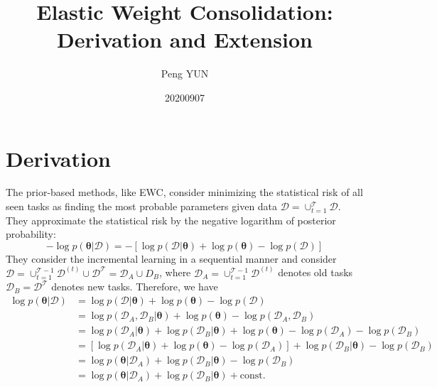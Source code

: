 \documentclass{article}
\title{Elastic Weight Consolidation: Derivation and Extension}
\author{Peng YUN}
\date{20200907}
\begin{document}
\maketitle


\section{Derivation}

The prior-based methods, like EWC\cite{Kirkpatrick2017}, consider minimizing the statistical risk
of all seen tasks as finding the most probable parameters given data
$\mathcal D = \cup_{t=1}^{\mathcal T} \mathcal D$.
They approximate the statistical risk by the negative logarithm of posterior probability:
\begin{equation}
    -\log p(\boldsymbol{\theta} | \mathcal D) = 
    -[\log p(\mathcal D | \boldsymbol{\theta}) + \log p(\boldsymbol{\theta}) - \log p(\mathcal D)]
\end{equation}
They consider the incremental learning in a sequential manner
and consider $\mathcal D = \cup_{t=1}^{\mathcal T-1} \mathcal D^{(t)} \cup \mathcal D^{\mathcal T}
= \mathcal D_A \cup D_B$,
where $\mathcal D_A = \cup_{t=1}^{\mathcal T-1} \mathcal D^{(t)}$ denotes old tasks
$\mathcal D_B =  \mathcal D^{\mathcal T}$ denotes new tasks.
Therefore, we have
\begin{equation}
\begin{split}
    \log p(\boldsymbol{\theta}|\mathcal D) &= \log p(\mathcal D | \boldsymbol{\theta}) + 
    \log p(\boldsymbol{\theta}) - \log p(\mathcal D)\\
    &= \log p(\mathcal D_A, \mathcal D_B | \boldsymbol{\theta}) + 
    \log p(\boldsymbol{\theta}) - \log p(\mathcal D_A, \mathcal D_B)\\
    &= \log p(\mathcal D_A| \boldsymbol{\theta}) + 
    \log p(\mathcal D_B | \boldsymbol{\theta}) + 
    \log p(\boldsymbol{\theta})
    - \log p(\mathcal D_A) - \log p(\mathcal D_B) \\
    &= [\log p(\mathcal D_A| \boldsymbol{\theta})
    +\log p(\boldsymbol{\theta})-\log p(\mathcal D_A)] 
    + \log p(\mathcal D_B | \boldsymbol{\theta}) - \log p(\mathcal D_B)\\
    &= \log p(\boldsymbol{\theta}|\mathcal D_A) + \log p(\mathcal D_B | \boldsymbol{\theta})
    - \log p(\mathcal D_B) \\
    &= \log p(\boldsymbol{\theta}|\mathcal D_A) + \log p(\mathcal D_B | \boldsymbol{\theta})
    + \text{const.}
\end{split}
\end{equation}
\end{document}
